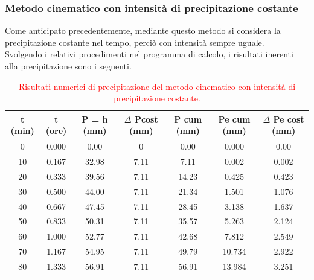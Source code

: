 \subsubsection{Metodo cinematico con intensità di precipitazione costante}
Come anticipato precedentemente, mediante questo metodo si considera la precipitazione costante nel tempo, perciò con intensità sempre uguale.\\
Svolgendo i relativi procedimenti nel programma di calcolo, i risultati inerenti alla precipitazione sono i seguenti.
\begin{table}[H] \centering
    \caption{\textcolor{red}{Risultati numerici di precipitazione del metodo cinematico con intensità di precipitazione costante.}}
\begin{tabular}{ccccccc}
    \toprule
t (min) & t (ore) & P = h (mm) & $\Delta$ Pcost (mm) & P cum           (mm) & Pe cum (mm) & $\Delta$ Pe cost (mm) \\
\midrule
    0       & 0.000   & 0.00                 & 0            & 0.00                 & 0.000       & 0.00           \\
    10      & 0.167   & 32.98                & 7.11         & 7.11                 & 0.002       & 0.002          \\
    20      & 0.333   & 39.56                & 7.11         & 14.23                & 0.425       & 0.423          \\
    30      & 0.500   & 44.00                & 7.11         & 21.34                & 1.501       & 1.076          \\
    40      & 0.667   & 47.45                & 7.11         & 28.45                & 3.138       & 1.637          \\
    50      & 0.833   & 50.31                & 7.11         & 35.57                & 5.263       & 2.124          \\
    60      & 1.000   & 52.77                & 7.11         & 42.68                & 7.812       & 2.549          \\
    70      & 1.167   & 54.95                & 7.11         & 49.79                & 10.734      & 2.922          \\
    80      & 1.333   & 56.91                & 7.11         & 56.91                & 13.984      & 3.251         \\
    \bottomrule
    \end{tabular}
    \end{table}

